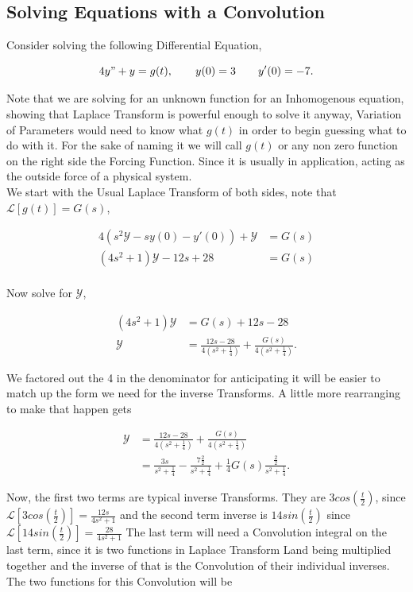 \documentclass[12pt]{article}
\newcommand{\lp}{\mathscr{L}}
\newcommand{\hugey}{\mathscr{Y}}
\begin{document}
\subsection{Solving Equations with a Convolution}

Consider solving the following Differential Equation,

\begin{equation*}
    4y"+y=g(t), \qquad y(0)=3 \qquad y'(0)=-7.
\end{equation*}

Note that we are solving for an unknown function for an Inhomogenous equation, showing that Laplace Transform is powerful enough to solve it anyway, Variation of Parameters would need to know what $g(t)$ in order to begin guessing what to do with it. For the sake of naming it we will call $g(t)$ or any non zero function on the right side the Forcing Function. Since it is usually in application, acting as the outside force of a physical system. \\

We start with the Usual Laplace Transform of both sides, note that $\lp[g(t)]=G(s)$,

\begin{align*}
    4(s^2\hugey-sy(0)-y'(0))+\hugey &=G(s) \\
    (4s^2+1)\hugey-12s+28 &=G(s) \\
\end{align*}

Now solve for $\hugey$,

\begin{align*}
    (4s^2+1)\hugey&=G(s)+12s-28 \\
    \hugey &= \frac{12s-28}{4(s^2+\frac{1}{4})} + \frac{G(s)}{4(s^2+\frac{1}{4})}.
\end{align*}

We factored out the 4 in the denominator for anticipating it will be easier to match up the form we need for the inverse Transforms. A little more rearranging to make that happen gets

\begin{align*}
    \hugey &= \frac{12s-28}{4(s^2+\frac{1}{4})} + \frac{G(s)}{4(s^2+\frac{1}{4})} \\
    &= \frac{3s}{s^2+\frac{1}{4}}-\frac{7\frac{2}{2}}{s^2+\frac{1}{4}} + \frac{1}{4}G(s)\frac{\frac{2}{2}}{s^2+\frac{1}{4}}.
\end{align*}

Now, the first two terms are typical inverse Transforms. They are $3cos\left(\frac{t}{2}\right)$, since $\lp[3cos\left(\frac{t}{2}\right)]=\frac{12s}{4s^2+1}$ and the second term inverse is $14sin\left(\frac{t}{2}\right)$ since $\lp[14sin\left(\frac{t}{2}\right)]=\frac{28}{4s^2+1}$ The last term will need a Convolution integral on the last term, since it is two functions in Laplace Transform Land being multiplied together and the inverse of that is the Convolution of their individual inverses. The two functions for this Convolution will be
\end{document}
